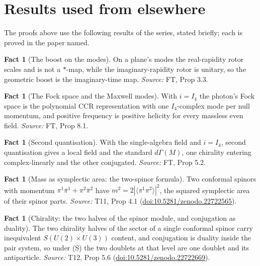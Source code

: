 \documentclass[11pt]{article}
\theoremstyle{definition}
\newtheorem{fact}[theorem]{Fact}
\theoremstyle{plain}
\providecommand{\br}{}\renewcommand{\br}[1]{\langle #1\rangle}
\begin{document}
\section{Results used from elsewhere}
The proofs above use the following results of the series, stated briefly; each is proved in the paper named.

\begin{fact}[The boost on the modes]\label{c:field-theory.boost-modes}
On a plane's modes the real-rapidity rotor scales and is not a $*$-map, while the imaginary-rapidity rotor is unitary, so the geometric boost is the imaginary-time map.
\emph{Source:} FT, Prop 3.3.
\end{fact}

\begin{fact}[The Fock space and the Maxwell modes]\label{c:field-theory.fock-space-maxwell-modes}
With $i = I_4$ the photon's Fock space is the polynomial CCR representation with one $I_4$-complex mode per null momentum, and positive frequency is positive helicity for every massless even field.
\emph{Source:} FT, Prop 8.1.
\end{fact}

\begin{fact}[Second quantisation]\label{c:field-theory.second-quantisation}
With the single-algebra field and $i = I_4$, second quantisation gives a local field and the standard $d\Gamma(M)$, one chirality entering complex-linearly and the other conjugated.
\emph{Source:} FT, Prop 5.2.
\end{fact}

\begin{fact}[Mass as symplectic area: the two-spinor formula]\label{c:mass.mass-symplectic-area-two-twistor-formula}
Two conformal spinors with momentum $\pi^{1}\bar\pi^{1} + \pi^{2}\bar\pi^{2}$ have $m^{2} = 2|\br{\pi^{1}\pi^{2}}|^{2}$, the squared symplectic area of their spinor parts.
\emph{Source:} T11, Prop 4.1 (\href{https://doi.org/10.5281/zenodo.22722565}{doi:10.5281/zenodo.22722565}).
\end{fact}

\begin{fact}[Chirality: the two halves of the spinor module, and conjugation as duality]\label{c:standard-model.chirality-two-halves-spinor-module-conjugation}
The two chirality halves of the sector of a single conformal spinor carry inequivalent $S(U(2) \times U(3))$ content, and conjugation is duality inside the pair system, so under (S) the two doublets at that level are one doublet and its antiparticle.
\emph{Source:} T12, Prop 5.6 (\href{https://doi.org/10.5281/zenodo.22722669}{doi:10.5281/zenodo.22722669}).
\end{fact}
\end{document}

